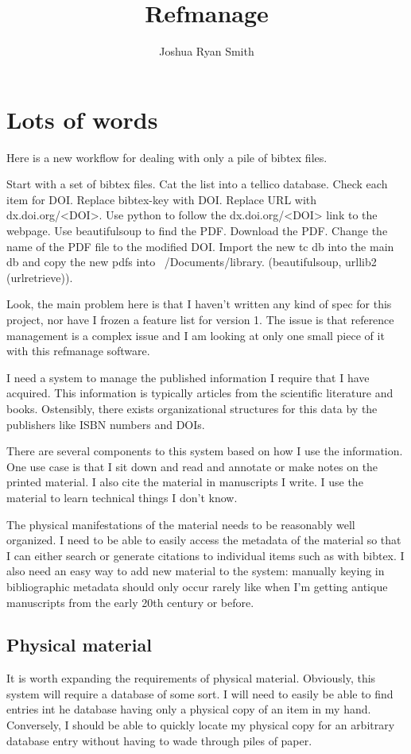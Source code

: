 \documentclass[letterpaper,12pt]{article}
\title{Refmanage}
\author{Joshua Ryan Smith}
\begin{document}
\maketitle
\section{Lots of words}
Here is a new workflow for dealing with only a pile of bibtex files. 

Start with a set of bibtex files. Cat the list into a tellico database. Check each item for DOI. Replace bibtex-key with DOI. Replace URL with dx.doi.org/<DOI>. Use python to follow the dx.doi.org/<DOI> link to the webpage. Use beautifulsoup to find the PDF. Download the PDF. Change the name of the PDF file to the modified DOI. Import the new tc db into the main db and copy the new pdfs into ~/Documents/library. (beautifulsoup, urllib2 (urlretrieve)).

Look, the main problem here is that I haven't written any kind of spec for this project, nor have I frozen a feature list for version 1. The issue is that reference management is a complex issue and I am looking at only one small piece of it with this refmanage software.

I need a system to manage the published information I require that I have acquired. This information is typically articles from the scientific literature and books. Ostensibly, there exists organizational structures for this data by the publishers like ISBN numbers and DOIs.

There are several components to this system based on how I use the information. One use case is that I sit down and read and annotate or make notes on the printed material. I also cite the material in manuscripts I write. I use the material to learn technical things I don't know.

The physical manifestations of the material needs to be reasonably well organized. I need to be able to easily access the metadata of the material so that I can either search or generate citations to individual items such as with bibtex. I also need an easy way to add new material to the system: manually keying in bibliographic metadata should only occur rarely like when I'm getting antique manuscripts from the early 20th century or before.

\subsection{Physical material}
It is worth expanding the requirements of physical material. Obviously, this system will require a database of some sort. I will need to easily be able to find entries int he database having only a physical copy of an item in my hand. Conversely, I should be able to quickly locate my physical copy for an arbitrary database entry without having to wade through piles of paper.
\end{document}
